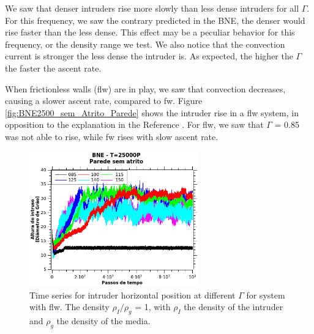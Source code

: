     We saw that denser intruders rise more slowly than less dense intruders for all $\Gamma$. For this frequency, we saw the contrary predicted in the BNE, the denser would rise faster than the less dense. This effect may be a peculiar behavior for this frequency, or the density range we test. We also notice that the convection current is stronger the less dense the intruder is. As expected, the higher the $\Gamma$ the faster the ascent rate.


    When frictionless walls (flw) are in play, we saw that convection decreases, causing a slower ascent rate, compared to fw. Figure \ref{fig:BNE2500_sem_Atrito_Parede} shows the intruder rise in a flw system, in opposition to the explanation in the Reference \cite{Inertia_in_the_Brazil_nut_problem}. For flw, we saw that $\Gamma$ = 0.85 was not able to rise, while fw rises with slow ascent rate.

\begin{figure}
    \centering
    \includegraphics[width=0.65\textwidth]{04-figuras/BNE25000PsemAtrito.png}
    \caption[BNE with frictionless walls.]{Time series for intruder horizontal position at different $\Gamma$ for system with flw. The density $\rho_I/\rho_g$ = 1, with $\rho_I$ the density of the intruder and $\rho_g$ the density of the media.}
    \label{fig:BNE25000_sem_Atrito_Parede}
\end{figure}


